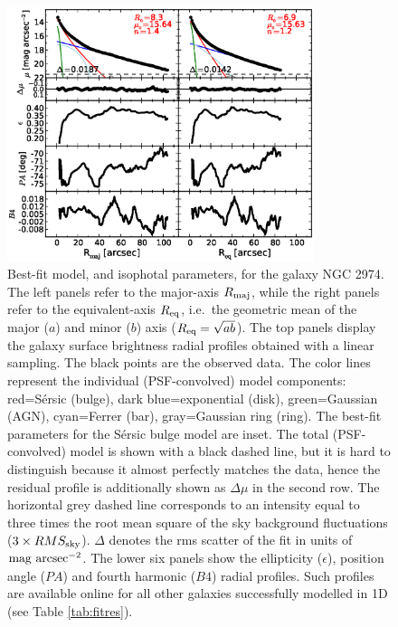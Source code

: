 \documentclass[preprint2]{emulateapj}
\newcommand{\fitfigurewidth}{0.8\textwidth}
\begin{document}
\begin{figure}[h]
\begin{center}
\includegraphics[width=\fitfigurewidth]{images/n2974_1Dfit.eps}
\caption{Best-fit model, and isophotal parameters, for the galaxy NGC 2974. 
The left panels refer to the major-axis $R_{\rm maj}$, 
while the right panels refer to the equivalent-axis $R_{\rm eq}$, 
i.e.~the geometric mean of the major ($a$) and minor ($b$) axis ($R_{\rm eq} = \sqrt{ab}$).
The top panels display the galaxy surface brightness radial profiles obtained with a linear sampling. 
The black points are the observed data.  
The color lines represent the individual (PSF-convolved) model components:
red=S\'ersic (bulge), dark blue=exponential (disk), green=Gaussian (AGN), cyan=Ferrer (bar), gray=Gaussian ring (ring). 
The best-fit parameters for the S\'ersic bulge model are inset.
The total (PSF-convolved) model is shown with a black dashed line, 
but it is hard to distinguish because it almost perfectly matches the data, 
hence the residual profile is additionally shown as $\Delta \mu$ in the second row.
The horizontal grey dashed line corresponds to an intensity 
equal to three times the root mean square of the sky background fluctuations ($3 \times RMS_{\rm sky}$).
$\Delta$ denotes the rms scatter of the fit in units of $\rm mag~arcsec^{-2}$.
The lower six panels show the ellipticity ($\epsilon$), position angle ($PA$) and fourth harmonic ($B4$) radial profiles. 
Such profiles are available online for all other galaxies successfully modelled in 1D (see Table \ref{tab:fitres}).}
\label{fig:n2974ex}
\end{center}
\end{figure}
\end{document}
